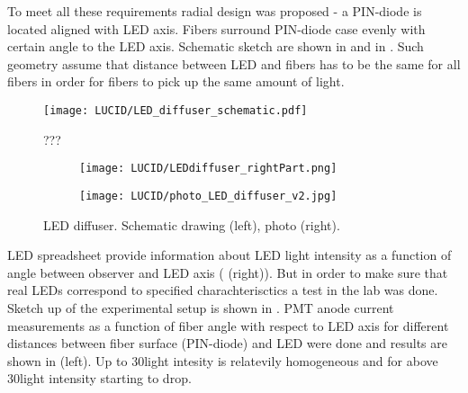 To meet all these requirements radial design was proposed - a PIN-diode is located aligned with LED axis. Fibers surround PIN-diode case 
evenly with certain angle to the LED axis. Schematic sketch are shown in  and in .
Such geometry assume that distance between LED and fibers has to be the same for all fibers in order for fibers to pick up the same amount of light.
  
\begin{figure}
\centering
\texttt{[image: LUCID/LED\_diffuser\_schematic.pdf]}
\caption{???}
\label{fig:AngularMeasurementSetup}
\end{figure}

\begin{figure}
\begin{subfigure}{.48\textwidth}
  \centering
  \texttt{[image: LUCID/LEDdiffuser\_rightPart.png]}
\end{subfigure}
\begin{subfigure}{.48\textwidth}
  \centering
  \texttt{[image: LUCID/photo\_LED\_diffuser\_v2.jpg]}
\end{subfigure}

\caption{LED diffuser. Schematic drawing (left), photo (right).}
\label{fig:LEDDiffuser}
\end{figure}
  


LED spreadsheet provide information about LED light intensity as a function of angle between observer and LED axis ( (right)).
But in order to make sure that real LEDs correspond to specified charachterisctics a test in the lab was done.
Sketch up of the experimental setup is shown in .
PMT anode current measurements as a function of fiber angle with respect to LED axis for different distances between 
fiber surface (PIN-diode) and LED were done and results are shown in  (left).
Up to 30\degree light intesity is relatevily homogeneous and for above 30\degree light intensity starting to drop.

